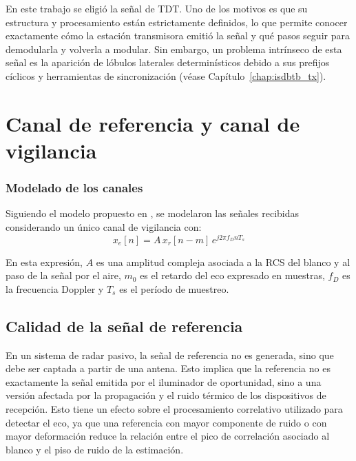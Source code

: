 	En este trabajo se eligió la señal de TDT. Uno de los motivos es que su estructura y procesamiento están estrictamente definidos, lo que permite conocer exactamente cómo la estación transmisora emitió la señal y qué pasos seguir para demodularla y volverla a modular. Sin embargo, un problema intrínseco de esta señal es la aparición de lóbulos laterales determinísticos debido a sus prefijos cíclicos y herramientas de sincronización (véase Capítulo~\ref{chap:isdbtb_tx}).



	\section{Canal de referencia y canal de vigilancia}
	\subsubsection{Modelado de los canales}
	Siguiendo el modelo propuesto en \cite{cristallini2023passive}, se modelaron las señales recibidas considerando un único canal de vigilancia con:
	\begin{equation}
	\label{eq:x_e}
	x_e[n] = A \, x_r[n-m] \, e^{j2\pi f_D n T_s}
	\end{equation}

	En esta expresión,  $A$ es una amplitud compleja asociada a la RCS del blanco y al paso de la señal por el aire, $m_0$ es el retardo del eco expresado en muestras, $f_D$ es la frecuencia Doppler y $T_s$ es el período de muestreo.

	\subsection{Calidad de la señal de referencia}
	En un sistema de radar pasivo, la señal de referencia no es generada, sino que debe ser captada a partir de una antena. Esto implica que la referencia no es exactamente la señal emitida por el iluminador de oportunidad, sino a una versión afectada por la propagación y el ruido térmico de los dispositivos de recepción. Esto tiene un efecto sobre el procesamiento correlativo utilizado para detectar el eco, ya que una referencia con mayor componente de ruido o con mayor deformación reduce la relación entre el pico de correlación asociado al blanco y el piso de ruido de la estimación.

